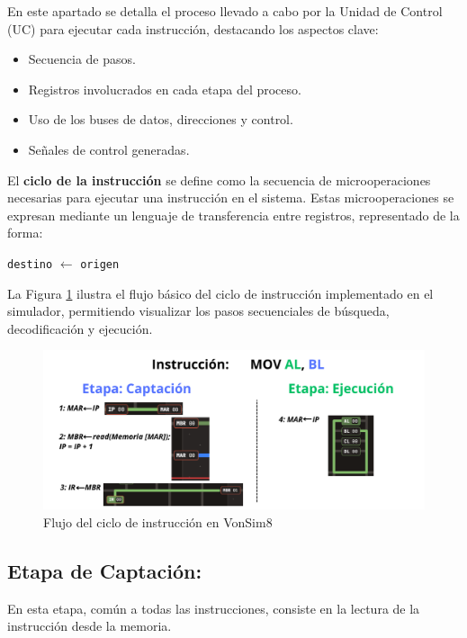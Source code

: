 \documentclass[12pt,oneside]{templates/unerthesis}
\providecommand{\tightlist}{%
  \setlength{\itemsep}{0pt}\setlength{\parskip}{0pt}}
\begin{document}
En este apartado se detalla el proceso llevado a cabo por la Unidad de Control (UC) para ejecutar cada instrucción, destacando los aspectos clave:

\begin{itemize}
\tightlist
\item
  Secuencia de pasos.
\item
  Registros involucrados en cada etapa del proceso.
\item
  Uso de los buses de datos, direcciones y control.
\item
  Señales de control generadas.
\end{itemize}

El \textbf{ciclo de la instrucción} se define como la secuencia de microoperaciones necesarias para ejecutar una instrucción en el sistema. Estas microoperaciones se expresan mediante un lenguaje de transferencia entre registros, representado de la forma:

\texttt{destino} \(\leftarrow\) \texttt{origen}

La Figura \ref{fig:flujoCicloInstruccion} ilustra el flujo básico del ciclo de instrucción implementado en el simulador, permitiendo visualizar los pasos secuenciales de búsqueda, decodificación y ejecución.

\begin{figure}

{\centering \includegraphics[width=0.85\linewidth]{images/cicloinstruccion2} 

}

\caption{Flujo del ciclo de instrucción en VonSim8}\label{fig:flujoCicloInstruccion}
\end{figure}

\hypertarget{etapa-de-captaciuxf3n}{%
\subsection{Etapa de Captación:}\label{etapa-de-captaciuxf3n}}

En esta etapa, común a todas las instrucciones, consiste en la lectura de la instrucción desde la memoria.
\end{document}
